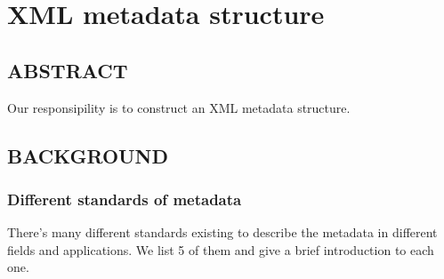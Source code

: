 \section*{XML metadata structure}
\subsection{ABSTRACT}
\label{sec:abs}
Our responsipility is to construct an XML metadata structure.

\subsection{BACKGROUND}

\subsubsection{Different standards of metadata}
\label{sec:mets}
There's many different standards existing to describe the metadata in different fields and applications. We list 5 of them and give a brief introduction to each one.

